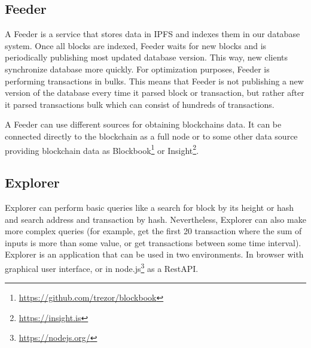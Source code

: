 \subsection{Feeder}
A Feeder is a service that stores data in IPFS and indexes them in our database system. Once all blocks are indexed, Feeder waits for new blocks and is periodically publishing most updated database version. This way, new clients synchronize database more quickly. For optimization purposes, Feeder is performing transactions in bulks. This means that Feeder is not publishing a new version of the database every time it parsed block or transaction, but rather after it parsed transactions bulk which can consist of hundreds of transactions.  

A Feeder can use different sources for obtaining blockchains data. It can be connected directly to the blockchain as a full node or to some other data source providing blockchain data as Blockbook\footnote{\url{https://github.com/trezor/blockbook}} or Insight\footnote{\url{https://insight.is}}.


\subsection{Explorer}
Explorer can perform basic queries like a search for block by its height or hash and search address and transaction by hash. Nevertheless, Explorer can also make more complex queries (for example, get the first 20 transaction where the sum of inputs is more than some value, or get transactions between some time interval). Explorer is an application that can be used in two environments. In browser with graphical user interface, or in node.js\footnote{\url{https://nodejs.org/}} as a RestAPI.

